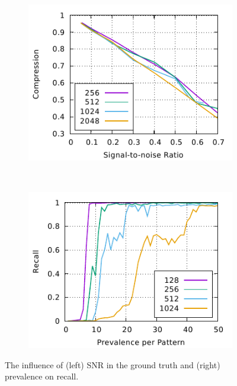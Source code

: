 \documentclass{llncs}
\begin{document}

\begin{figure}[t]%
	\begin{subfigure}[t]{0.5\textwidth}
	\includegraphics[scale=1]{figures/experiments-gnuplottex-fig1.pdf}

	\end{subfigure}%
	~
	\begin{subfigure}[t]{0.5\textwidth}
	\includegraphics[scale=1]{figures/experiments-gnuplottex-fig2.pdf}
	\end{subfigure}
	\caption{The influence of (left) SNR in the ground truth and (right) prevalence on recall.} 
	\label{fig:plots}
\end{figure}
\end{document}
